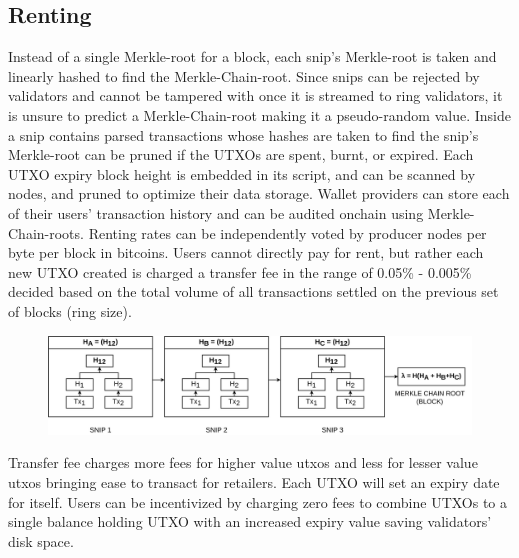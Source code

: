 \documentclass[a4paper, 10pt]{extarticle}
\begin{document}
\subsection{Renting}
Instead of a single Merkle-root for a block, each snip's Merkle-root is taken and linearly hashed to find the Merkle-Chain-root. Since snips can be rejected by validators and cannot be tampered with once it is streamed to ring validators, it is unsure to predict a Merkle-Chain-root making it a pseudo-random value. Inside a snip contains parsed transactions whose hashes are taken to find the snip's Merkle-root can be pruned if the UTXOs are spent, burnt, or expired. Each UTXO expiry block height is embedded in its script, and can be scanned by nodes, and pruned to optimize their data storage. Wallet providers can store each of their users' transaction history and can be audited onchain using Merkle-Chain-roots. Renting rates can be independently voted by producer nodes per byte per block in bitcoins. Users cannot directly pay for rent, but rather each new UTXO created is charged a transfer fee in the range of 0.05\% - 0.005\% decided based on the total volume of all transactions settled on the previous set of blocks (ring size).
\begin{figure}[H]
\begin{center}
\includegraphics[width=13cm]{merklechain}
\end{center}
\end{figure}
 Transfer fee charges more fees for higher value utxos and less for lesser value utxos bringing ease to transact for retailers. Each UTXO will set an expiry date for itself. Users can be incentivized by charging zero fees to combine UTXOs to a single balance holding UTXO with an increased expiry value saving validators' disk space. 
\end{document}
